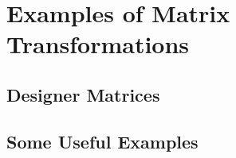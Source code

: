 \documentclass[elementsmain.tex]{subfiles}
\begin{document}
\section{Examples of Matrix Transformations}

\subsection*{Designer Matrices}


\subsection*{Some Useful Examples}




\clearpage
\end{document}
